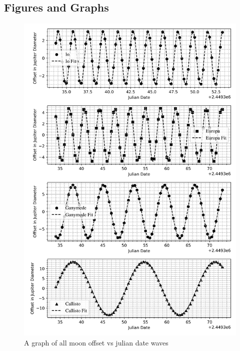 \documentclass[12pt, a4paper]{article}
\begin{document}
\subsection{Figures and Graphs}
\begin{figure}[H]
    \centering
    \includegraphics[width = \textwidth]{4Plot1.png}
    \caption{A graph of all moon offset vs julian date waves}
    \label{fig:Fig 4.1}
\end{figure}
\end{document}
